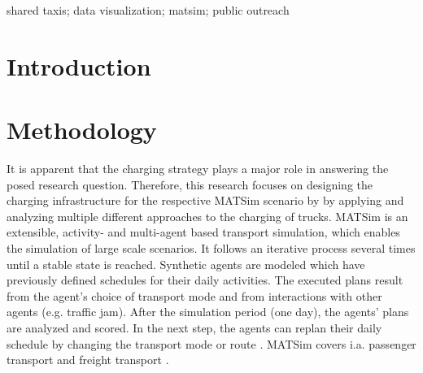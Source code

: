 \documentclass[3p,times,procedia]{elsarticle}
\begin{document}
\begin{frontmatter}
\begin{keyword}
shared taxis; data visualization; matsim; public outreach




\end{keyword}


\end{frontmatter}



\section{Introduction}
\label{introduction}



\section{Methodology}
\label{methodology}
It is apparent that the charging strategy plays a major role in answering the posed research question. Therefore, this research focuses on designing the charging infrastructure for the respective MATSim scenario by \citet{MartinsturnerEtAl2020ETrucksFoodABMTrans} by applying and analyzing multiple different approaches to the charging of trucks.
MATSim is an extensible, activity- and multi-agent based transport simulation, which enables the simulation of large scale scenarios. It follows an iterative process several times until a stable state is reached. Synthetic agents are modeled which have previously defined schedules for their daily activities. The executed plans result from the agent's choice of transport mode and from interactions with other agents (e.g. traffic jam). After the simulation period (one day), the agents’ plans are analyzed and scored. In the next step, the agents can replan their daily schedule by changing the transport mode or route \cite{MATSimBook}. MATSim covers i.a. passenger transport \cite{ZiemkeEtAl2019OpenBerlinScenario} and freight transport \cite{SchroederLiedtke2014FoodDistributionBerlin, ZilskeJoubert2015FreightTrafficInBook}.
\end{document}
